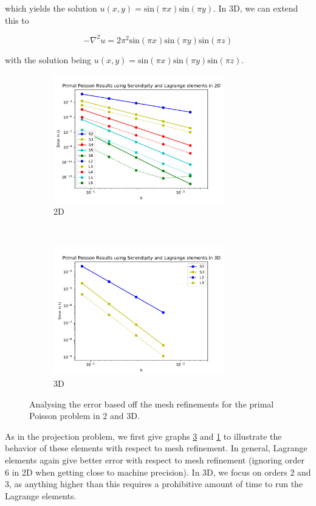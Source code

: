 \documentclass[manuscript,screen]{acmart}
\begin{document}
\noindent which yields the solution $u(x,y) = \text{sin}(\pi x)\text{sin}(\pi y)$.  In 3D, we can extend this to 

\[-\nabla^2 u = 2\pi^2\text{sin}(\pi x)\text{sin}(\pi y)\text{sin}(\pi z) \]

\noindent with the solution being $u(x,y) = \text{sin}(\pi x)\text{sin}(\pi y)\text{sin}(\pi z)$.  

\begin{figure}[t!]
  \centering
  \begin{subfigure}[t]{0.5\textwidth}
    \centering
    \includegraphics[height=2.2in]{2dPrimalH.pdf}
    \caption{2D}
    \label{fig:2dPrimalH}
  \end{subfigure}
  ~
  \begin{subfigure}[t]{0.5\textwidth}
    \centering
    \includegraphics[height=2.2in]{3dPrimalH.pdf}
    \caption{3D}
    \label{fig:3dPrimalH}
  \end{subfigure}
  \caption{Analysing the error based off the mesh refinements for the primal Poisson problem in 2 and 3D.}
\end{figure}  
\noindent  As in the projection problem, we first give graphs \ref{fig:3dPrimalH} and \ref{fig:2dPrimalH} to illustrate the behavior of these elements with respect to mesh refinement.  In general, Lagrange elements again give better error with respect to mesh refinement (ignoring order 6 in 2D when getting close to machine precision).  In 3D, we focus on orders 2 and 3, as anything higher than this requires a prohibitive amount of time to run the Lagrange elements.  
\end{document}
